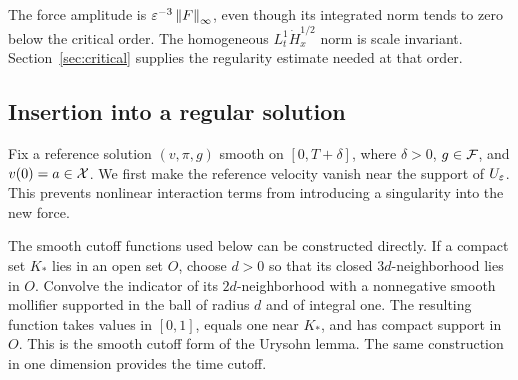 The force amplitude is $\varepsilon^{-3}\left\lVert F\right\rVert_\infty$, even though its integrated norm tends to zero below the critical order. The homogeneous $L^1_t\dot H^{1/2}_x$ norm is scale invariant. Section~\ref{sec:critical} supplies the regularity estimate needed at that order.

\subsection{Insertion into a regular solution}\label{sec:insertion}
Fix a reference solution $(v,\pi,g)$ smooth on $[0,T+\delta]$, where
$\delta>0$, $g\in\mathcal F$, and $v(0)=a\in\mathcal X$. We first make the reference velocity vanish near the support of $U_\varepsilon$. This prevents nonlinear interaction terms from introducing a singularity into the new force.

The smooth cutoff functions used below can be constructed directly.
If a compact set $K_*$ lies in an open set $O$, choose $d>0$ so that its
closed $3d$-neighborhood lies in $O$. Convolve the indicator of its
$2d$-neighborhood with a nonnegative smooth mollifier supported in the
ball of radius $d$ and of integral one. The resulting function takes
values in $[0,1]$, equals one near $K_*$, and has compact support in $O$.
This is the smooth cutoff form of the Urysohn lemma. The same construction
in one dimension provides the time cutoff.

